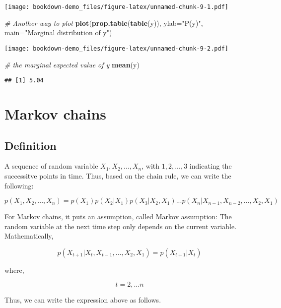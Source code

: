 \documentclass[]{book}
\newenvironment{Shaded}{\begin{snugshade}}{\end{snugshade}}
\newcommand{\CommentTok}[1]{\textcolor[rgb]{0.56,0.35,0.01}{\textit{#1}}}
\newcommand{\DataTypeTok}[1]{\textcolor[rgb]{0.13,0.29,0.53}{#1}}
\newcommand{\KeywordTok}[1]{\textcolor[rgb]{0.13,0.29,0.53}{\textbf{#1}}}
\newcommand{\NormalTok}[1]{#1}
\newcommand{\StringTok}[1]{\textcolor[rgb]{0.31,0.60,0.02}{#1}}
\begin{document}
\texttt{[image: bookdown-demo\_files/figure-latex/unnamed-chunk-9-1.pdf]}

\begin{Shaded}
\begin{Highlighting}[]
\CommentTok{# Another way to plot }
\KeywordTok{plot}\NormalTok{(}\KeywordTok{prop.table}\NormalTok{(}\KeywordTok{table}\NormalTok{(y)), }\DataTypeTok{ylab=}\StringTok{"P(y)"}\NormalTok{, }\DataTypeTok{main=}\StringTok{"Marginal distribution of y"}\NormalTok{)}
\end{Highlighting}
\end{Shaded}

\texttt{[image: bookdown-demo\_files/figure-latex/unnamed-chunk-9-2.pdf]}

\begin{Shaded}
\begin{Highlighting}[]
\CommentTok{# the marginal expected value of y}
\KeywordTok{mean}\NormalTok{(y)}
\end{Highlighting}
\end{Shaded}

\begin{verbatim}
## [1] 5.04
\end{verbatim}

\hypertarget{markov-chains}{%
\section{Markov chains}\label{markov-chains}}

\hypertarget{definition}{%
\subsection{Definition}\label{definition}}

A sequence of random variable \(X_1, X_2,...,X_n\), with \(1, 2, ...,3\) indicating the successitve points in time. Thus, based on the chain rule, we can write the following:

\[p(X_1,X_2,...,X_n)=p(X_1)p(X_2|X_1)p(X_3|X_2,X_1)...p(X_n|X_{n-1},X_{n-2},...,X_2,X_1)\]

For Markov chains, it puts an assumption, called Markov assumption: The random variable at the next time step only depends on the current variable. Mathematically,

\[p(X_{t+1}|X_t,X_{t-1},...,X_2,X_1)=p(X_{t+1}|X_t)\]

where,

\[t=2, ...n\]

Thus, we can write the expression above as follows.
\end{document}
